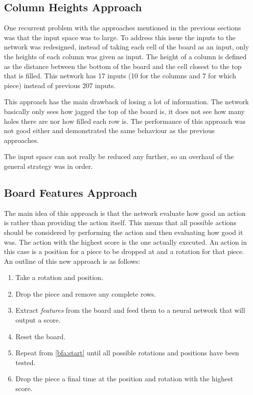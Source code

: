 \documentclass{article}
\begin{document}
\subsection{Column Heights Approach}
One recurrent problem with the approaches mentioned in the previous sections was that the input space was to large. To address this issue the inputs to the network was redesigned, instead of taking each cell of the board as an input, only the heights of each column was given as input. The height of a column is defined as the distance between the bottom of the board and the cell closest to the top that is filled. This network has 17 inputs (10 for the columns and 7 for which piece) instead of previous 207 inputs. 

This approach has the main drawback of losing a lot of information. The network basically only sees how jagged the top of the board is, it does not see how many holes there are nor how filled each row is.
The performance of this approach was not good either and demonstrated the same behaviour as the previous approaches.

The input space can not really be reduced any further, so an overhaul of the general strategy was in order.

\subsection{Board Features Approach}\label{sec:features}

The main idea of this approach is that the network evaluate how good an action is rather than providing the action itself. This means that all possible actions should be considered by performing the action and then evaluating how good it was. The action with the highest score is the one actually executed. An action in this case is a position for a piece to be dropped at and a rotation for that piece. An outline of this new approach is as follows:

\begin{enumerate}
    \item Take a rotation and position.\label{bfa:start}
    \item Drop the piece and remove any complete rows.
    \item Extract \emph{features} from the board and feed them to a neural network that will output a score.
    \item Reset the board.
    \item Repeat from \ref{bfa:start} until all possible rotations and positions have been tested.
    \item Drop the piece a final time at the position and rotation with the highest score.
\end{enumerate}
\end{document}
